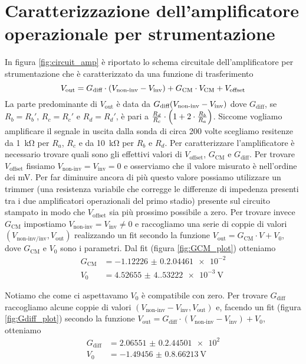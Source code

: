 \documentclass[
    prl,
    reprint, 
    superscriptaddress, 
    altaffilletter, 
    amsmath, 
    amssymb, 
    a4paper,
    varvw]{revtex4-2}
\begin{document}

\section{Caratterizzazione dell'amplificatore operazionale per strumentazione}\label{sec:appendix_strum_opamp}
In figura \ref{fig:circuit_amp} è riportato lo schema circuitale dell'amplificatore per strumentazione che  è caratterizzato da una funzione di trasferimento \begin{equation}
    V_\text{out} = G_\text{diff}\cdot \qty(V_\text{non-inv}-V_\text{inv}) +  G_\text{CM}\cdot V_\text{CM} + V_\text{offset} 
\end{equation}
La parte predominante di $V_\text{out}$ è data da $G_\text{diff}\qty(V_\text{non-inv}-V_\text{inv})$ dove $G_\text{diff}$, se $R_b=R_b'$, $R_c=R_c'$ e $R_d=R_d'$, è pari a $\frac{R_{d}}{R_{c}}\cdot \qty(1+2\cdot \frac{R_{b}}{R_{a}})$. Siccome vogliamo amplificare il segnale in uscita dalla sonda di circa 200 volte scegliamo resitenze da \SI{1}{\kilo\ohm} per $R_a$, $R_c$ e da \SI{10}{\kilo\ohm} per $R_b$ e $R_d$. Per caratterizzare l'amplificatore è necessario trovare quali sono gli effettivi valori di $V_\text{offset}$, $G_\text{CM}$ e $G_\text{diff}$. 
Per trovare $V_\text{offset}$ fissiamo $V_\text{non-inv}=V_\text{inv}=0$ e osserviamo che il valore misurato è nell'ordine dei \si{\milli\volt}. Per far diminuire ancora di più questo valore possiamo utilizzare un trimmer (una resistenza variabile che corregge le differenze di impedenza presenti tra i due amplificatori operazionali del primo stadio) presente sul circuito stampato in modo che $V_\text{offset}$ sia più prossimo possibile a zero.
Per trovare invece $G_\text{CM}$ impostiamo $V_\text{non-inv}=V_\text{inv}\neq 0$ e raccogliamo una serie di coppie di valori $(V_\text{non-inv/inv},V_\text{out})$ realizzando un fit secondo la funzione $V_\text{out}=G_\text{CM}\cdot V+V_0$, dove $G_\text{CM}$ e $V_0$ sono i parametri. Dal fit (figura \ref{fig:GCM_plot}) otteniamo \begin{align*}
    G_\text{CM} &= \num{-1.12226(0.204461)e-2}\\
    V_0 &= \SI{4.52655(4.53222)e-3}{\volt}
\end{align*}

Notiamo che come ci aspettavamo $V_0$ è compatibile con zero.
Per trovare $G_\text{diff}$  raccogliamo alcune coppie di valori $(V_\text{non-inv}-V_\text{inv},V_\text{out})$ e, facendo un fit (figura \ref{fig:Gdiff_plot}) secondo la funzione $V_\text{out}=G_\text{diff}\cdot (V_\text{non-inv}-V_\text{inv})+V_0$, otteniamo \begin{align*}
    G_\text{diff} &= \num{2.06551(0.244501)e2}\\
    V_0 &= \SI{-1.49456(0.866213)}{\volt}
\end{align*}
\end{document}
